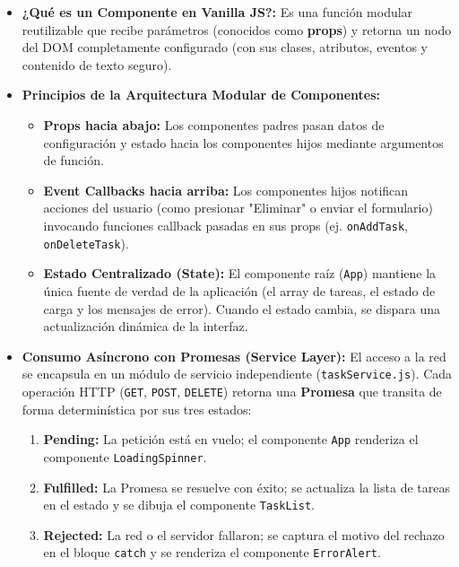 \documentclass[10pt,letterpaper]{article}
\begin{document}
\begin{itemize}[leftmargin=*,itemsep=1.5pt,topsep=2pt]
  \item \textbf{¿Qué es un Componente en Vanilla JS?:} Es una función modular reutilizable que recibe parámetros (conocidos como \textbf{props}) y retorna un nodo del DOM completamente configurado (con sus clases, atributos, eventos y contenido de texto seguro).
  \item \textbf{Principios de la Arquitectura Modular de Componentes:}
    \begin{itemize}
      \item \textbf{Props hacia abajo:} Los componentes padres pasan datos de configuración y estado hacia los componentes hijos mediante argumentos de función.
      \item \textbf{Event Callbacks hacia arriba:} Los componentes hijos notifican acciones del usuario (como presionar "Eliminar" o enviar el formulario) invocando funciones callback pasadas en sus props (ej. \texttt{onAddTask}, \texttt{onDeleteTask}).
      \item \textbf{Estado Centralizado (State):} El componente raíz (\texttt{App}) mantiene la única fuente de verdad de la aplicación (el array de tareas, el estado de carga y los mensajes de error). Cuando el estado cambia, se dispara una actualización dinámica de la interfaz.
    \end{itemize}
  \item \textbf{Consumo Asíncrono con Promesas (Service Layer):} El acceso a la red se encapsula en un módulo de servicio independiente (\texttt{taskService.js}). Cada operación HTTP (\texttt{GET}, \texttt{POST}, \texttt{DELETE}) retorna una \textbf{Promesa} que transita de forma determinística por sus tres estados:
    \begin{enumerate}[label=\alph*)]
      \item \textbf{Pending:} La petición está en vuelo; el componente \texttt{App} renderiza el componente \texttt{LoadingSpinner}.
      \item \textbf{Fulfilled:} La Promesa se resuelve con éxito; se actualiza la lista de tareas en el estado y se dibuja el componente \texttt{TaskList}.
      \item \textbf{Rejected:} La red o el servidor fallaron; se captura el motivo del rechazo en el bloque \texttt{catch} y se renderiza el componente \texttt{ErrorAlert}.
    \end{enumerate}
\end{itemize}
\end{document}
